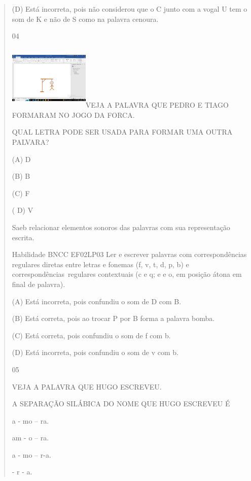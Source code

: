 \begin{verse}
{{{{{{{{{{{{{{{{(D) Está incorreta, pois não considerou que o C junto com a vogal U tem
o som de K e não de S como na palavra cenoura.

\num{04}

\includegraphics[width=1.50909in,height=1.22355in]{media/image150.png}VEJA
A PALAVRA QUE PEDRO E TIAGO FORMARAM NO JOGO DA FORCA.

\protect\hypertarget{_Hlk129505254}{}{}QUAL LETRA PODE SER USADA PARA
FORMAR UMA OUTRA PALVARA?

(A) D

(B) B

(C) F

( D) V

Saeb relacionar elementos sonoros das palavras com sua representação
escrita.

Habilidade BNCC EF02LP03 Ler e escrever palavras com correspondências
regulares diretas entre letras e fonemas (f, v, t, d, p, b) e
correspondências~regulares contextuais (c e q; e e o, em posição átona
em final de palavra).

(A) Está incorreta, pois confundiu o som de D com B.

(B) Está correta, pois ao trocar P por B forma a palavra bomba.

(C) Está correta, pois confundiu o som de f com b.

(D) Está incorreta, pois confundiu o som de v com b.

\num{05}

VEJA A PALAVRA QUE HUGO ESCREVEU.

A SEPARAÇÃO SILÁBICA DO NOME QUE HUGO ESCREVEU É

\begin{escolha}
\item a - mo -- ra.

\item am - o -- ra.

\item a - mo -- r-a.

\itemamo- r - a.
\end{escolha}

}}}}}}}}}}}}}}}}
\end{verse}
